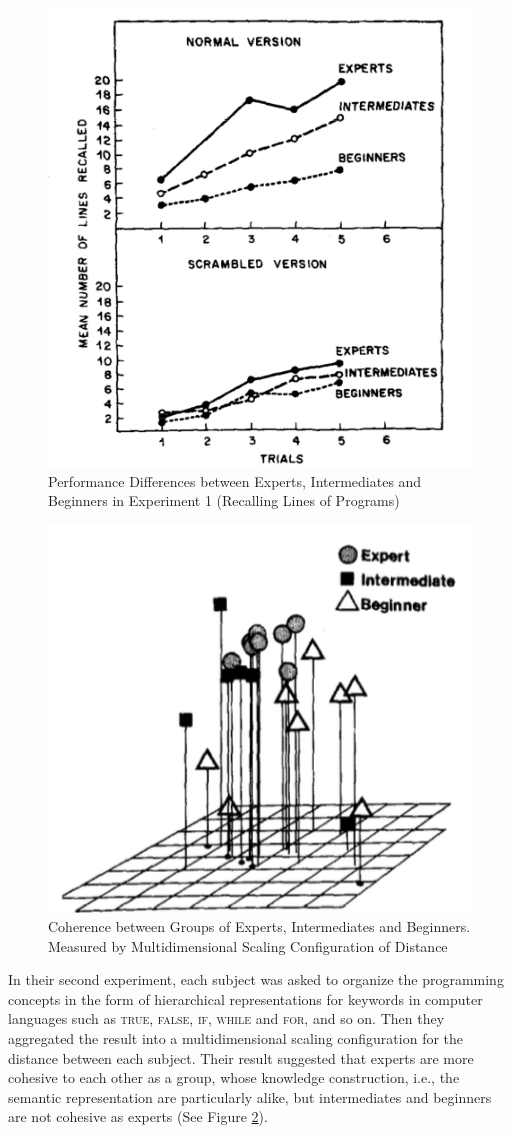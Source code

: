\begin{figure}
\includegraphics[width = 0.5\columnwidth]{reitmanE1.png}
\centering
\caption{Performance Differences between Experts, Intermediates and Beginners in Experiment 1 (Recalling Lines of Programs) \cite{MCKEITHEN1981307}}
\label{reitmanE1}
\end{figure}

\begin{figure}
\includegraphics[width = 0.5\columnwidth]{reitmanE2.png}
\centering
\caption{Coherence between Groups of Experts, Intermediates and Beginners. Measured by Multidimensional Scaling Configuration of Distance \cite{MCKEITHEN1981307}}
\label{reitmanE2}
\end{figure}

In their second experiment, each subject was asked to organize the programming concepts in the form of hierarchical representations for keywords in computer languages such as \textsc{true, false}, \textsc{if, while} and \textsc{for}, and so on. Then they aggregated the result into a multidimensional scaling configuration for the distance between each subject. Their result suggested that experts are more cohesive to each other as a group, whose knowledge construction, i.e., the semantic representation \cite{bobrow1975representation} are particularly alike, but intermediates and beginners are not cohesive as experts (See Figure \ref{reitmanE2}).

